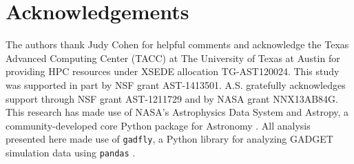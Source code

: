 \documentclass[usenatbib]{mn2e}
\begin{document}
\section*{Acknowledgements}
The authors thank Judy Cohen for helpful comments and acknowledge the Texas Advanced Computing Center (TACC) at The University of Texas at Austin for providing HPC resources under XSEDE allocation TG-AST120024. This study was supported in part by NSF grant AST-1413501. A.S. gratefully acknowledges support through NSF grant AST-1211729 and by NASA grant NNX13AB84G. This research has made use of NASA's Astrophysics Data System and Astropy, a community-developed core Python package for Astronomy \citep{Robitailleetal2013}. All analysis presented here made use of \verb|gadfly|, a Python library for analyzing GADGET simulation data using \verb|pandas| \citep{Hummel2016}.

\end{document}
